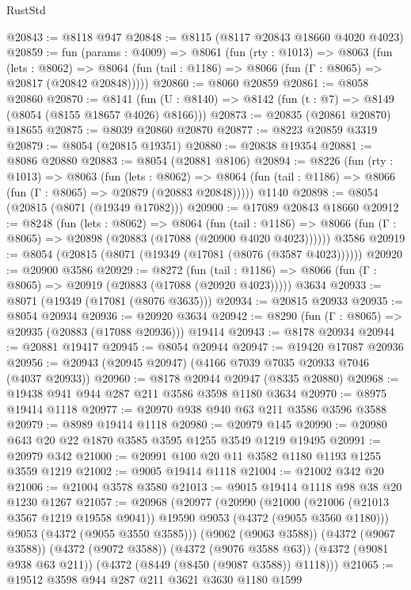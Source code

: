 \begin{lexlean}{RustStd}
\begin{coremodule}
@20843 := @8118 @947
@20848 := @8115 (@8117 @20843 @18660 @4020 @4023)
@20859 := fun (params : @4009) =>
  @8061
    (fun (rty : @1013) =>
    @8063
      (fun (lets : @8062) =>
      @8064 (fun (tail : @1186) => @8066 (fun (Γ : @8065) => @20817 (@20842 @20848)))))
@20860 := @8060 @20859
@20861 := @8058 @20860
@20870 := @8141
    (fun (U : @8140) => @8142 (fun (t : @7) => @8149 (@8054 (@8155 @18657 @4026) @8166)))
@20873 := @20835 (@20861 @20870) @18655
@20875 := @8039 @20860 @20870
@20877 := @8223 @20859 @3319
@20879 := @8054 (@20815 @19351)
@20880 := @20838 @19354
@20881 := @8086 @20880
@20883 := @8054 (@20881 @8106)
@20894 := @8226
    (fun (rty : @1013) =>
    @8063
      (fun (lets : @8062) =>
      @8064 (fun (tail : @1186) => @8066 (fun (Γ : @8065) => @20879 (@20883 @20848)))))
    @1140
@20898 := @8054 (@20815 (@8071 (@19349 @17082)))
@20900 := @17089 @20843 @18660
@20912 := @8248
    (fun (lets : @8062) =>
    @8064
      (fun (tail : @1186) =>
      @8066 (fun (Γ : @8065) => @20898 (@20883 (@17088 (@20900 @4020 @4023))))))
    @3586
@20919 := @8054 (@20815 (@8071 (@19349 (@17081 (@8076 (@3587 @4023))))))
@20920 := @20900 @3586
@20929 := @8272
    (fun (tail : @1186) => @8066 (fun (Γ : @8065) => @20919 (@20883 (@17088 (@20920 @4023)))))
    @3634
@20933 := @8071 (@19349 (@17081 (@8076 @3635)))
@20934 := @20815 @20933
@20935 := @8054 @20934
@20936 := @20920 @3634
@20942 := @8290 (fun (Γ : @8065) => @20935 (@20883 (@17088 @20936))) @19414
@20943 := @8178 @20934
@20944 := @20881 @19417
@20945 := @8054 @20944
@20947 := @19420 @17087 @20936
@20956 := @20943 (@20945 @20947) (@4166 @7039 @7035 @20933 @7046 (@4037 @20933))
@20960 := @8178 @20944 @20947 (@8335 @20880)
@20968 := @19438 @941 @944 @287 @211 @3586 @3598 @1180 @3634
@20970 := @8975 @19414 @1118
@20977 := @20970 @938 @940 @63 @211 @3586 @3596 @3588
@20979 := @8989 @19414 @1118
@20980 := @20979 @145
@20990 := @20980 @643 @20 @22 @1870 @3585 @3595 @1255 @3549 @1219 @19495
@20991 := @20979 @342
@21000 := @20991 @100 @20 @11 @3582 @1180 @1193 @1255 @3559 @1219
@21002 := @9005 @19414 @1118
@21004 := @21002 @342 @20
@21006 := @21004 @3578 @3580
@21013 := @9015 @19414 @1118 @98 @38 @20 @1230 @1267
@21057 := @20968
    (@20977
      (@20990
        (@21000 (@21006 (@21013 @3567 @1219 @19558 @9041)) @19590 @9053 (@4372 (@9055 @3560 @1180)))
        @9053
        (@4372 (@9055 @3550 @3585)))
      (@9062 (@9063 @3588))
      (@4372 (@9067 @3588))
      (@4372 (@9072 @3588))
      (@4372 (@9076 @3588 @63))
      (@4372 (@9081 @938 @63 @211))
      (@4372 (@8449 (@8450 (@9087 @3588)) @1118)))
@21065 := @19512 @3598 @944 @287 @211 @3621 @3630 @1180 @1599

\end{coremodule}
\end{lexlean}
